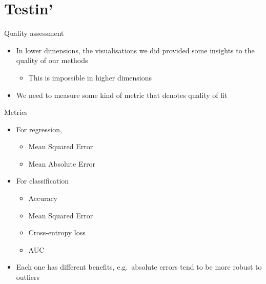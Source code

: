 \documentclass[obeyspaces,aspectratio=43]{beamer}
\providecommand{\tightlist}{%
  \setlength{\itemsep}{0pt}\setlength{\parskip}{0pt}}
\begin{document}
\section{Testin'}\label{testin}

\begin{frame}{Quality assessment}

\begin{itemize}
\tightlist
\item
  In lower dimensions, the visualisations we did provided some insights
  to the quality of our methods

  \begin{itemize}
  \tightlist
  \item
    This is impossible in higher dimensions
  \end{itemize}
\item
  We need to measure some kind of metric that denotes quality of fit
\end{itemize}

\end{frame}

\begin{frame}{Metrics}

\begin{itemize}
\tightlist
\item
  For regression,

  \begin{itemize}
  \tightlist
  \item
    Mean Squared Error
  \item
    Mean Absolute Error
  \end{itemize}
\item
  For classification

  \begin{itemize}
  \tightlist
  \item
    Accuracy
  \item
    Mean Squared Error
  \item
    Cross-entropy loss
  \item
    AUC
  \end{itemize}
\item
  Each one has different benefits, e.g.~absolute errors tend to be more
  robust to outliers
\end{itemize}

\end{frame}
\end{document}
